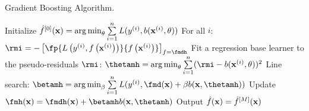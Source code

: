 \begin{algorithm}[H]
  \begin{footnotesize}
  \begin{center}
  \caption{Gradient Boosting Algorithm.}
    \begin{algorithmic}[1]
      \State Initialize $\hat{f}^{[0]}(\mathbf{x}) = \operatorname{arg\,min}_{\theta} \sum\limits_{i=1}^n L(y^{(i)}, b(\mathbf{x}^{(i)}, \theta))$
          \State For all $i$: $\rmi = -\left[\fp{\Lxyi}{\fxi}\right]_{f=\fmdh}$
        \State Fit a regression base learner to the pseudo-residuals $\rmi$:
        \State $\thetamh = \argmin \limits_\theta \sumin (\rmi - b(\xi, \theta))^2$
        \State Line search: $\betamh = \argmin_{\beta} \sumin L(\yi, \fmd(\xv) + \beta b(\xv, \thetamh))$
        \State Update $\fmh(\xv) = \fmdh(\xv) + \betamh b(\xv, \thetamh)$
      \EndFor
      \State Output $\hat{f}(\mathbf{x}) = \hat{f}^{[M]}(\mathbf{x})$
    \end{algorithmic}
    \end{center}
    \end{footnotesize}
\end{algorithm}
